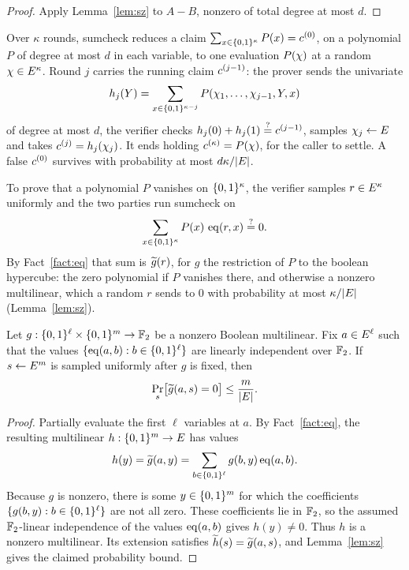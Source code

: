 \begin{proof}
Apply Lemma~\ref{lem:sz} to $A-B$, nonzero of total degree at most $d$.
\end{proof}


\begin{fact}\label{fact:sumcheck}
Over $\kappa$ rounds, sumcheck reduces a claim $\sum_{x\in\{0,1\}^{\kappa}}P(x)=c^{(0)}$, on a polynomial $P$ of degree at most $d$ in each variable, to one evaluation $P(\chi)$ at a random $\chi\in E^{\kappa}$. Round $j$ carries the running claim $c^{(j-1)}$: the prover sends the univariate
\[
  h_j(Y)=\sum_{x\in\{0,1\}^{\kappa-j}}P(\chi_1,\dots,\chi_{j-1},Y,x)
\]
of degree at most $d$, the verifier checks $h_j(0)+h_j(1)\stackrel{?}{=}c^{(j-1)}$, samples $\chi_j\leftarrow E$ and takes $c^{(j)}=h_j(\chi_j)$. It ends holding $c^{(\kappa)}=P(\chi)$, for the caller to settle. A false $c^{(0)}$ survives with probability at most $d\kappa/|E|$.
\end{fact}

\begin{definition}[Zerocheck]\label{def:zerocheck}
To prove that a polynomial $P$ vanishes on $\{0,1\}^{\kappa}$, the verifier samples $r\in E^{\kappa}$ uniformly and the two parties run sumcheck on
\[
  \sum_{x\in\{0,1\}^{\kappa}}P(x)\,\operatorname{eq}(r,x)\stackrel{?}{=} 0 .
\]
By Fact~\ref{fact:eq} that sum is $\widetilde{g}(r)$, for $g$ the restriction of $P$ to the boolean hypercube: the zero polynomial if $P$ vanishes there, and otherwise a nonzero multilinear, which a random $r$ sends to $0$ with probability at most $\kappa/|E|$ (Lemma~\ref{lem:sz}).
\end{definition}

\begin{lemma}\label{lem:fixed-zerocheck}
Let $g:\{0,1\}^{\ell}\times\{0,1\}^{m}\to\mathbb{F}_2$ be a nonzero Boolean multilinear. Fix $a\in E^{\ell}$ such that the values $\{\operatorname{eq}(a,b):b\in\{0,1\}^{\ell}\}$ are linearly independent over $\mathbb{F}_2$. If $s\leftarrow E^m$ is sampled uniformly after $g$ is fixed, then
\[
  \Pr_s\bigl[\widetilde{g}(a,s)=0\bigr]\leq\frac{m}{|E|}.
\]
\end{lemma}

\begin{proof}
Partially evaluate the first $\ell$ variables at $a$. By Fact~\ref{fact:eq}, the resulting multilinear $h:\{0,1\}^{m}\to E$ has values
\[
  h(y)=\widetilde{g}(a,y)=\sum_{b\in\{0,1\}^{\ell}}g(b,y)\operatorname{eq}(a,b).
\]
Because $g$ is nonzero, there is some $y\in\{0,1\}^{m}$ for which the coefficients $\{g(b,y):b\in\{0,1\}^{\ell}\}$ are not all zero. These coefficients lie in $\mathbb{F}_2$, so the assumed $\mathbb{F}_2$-linear independence of the values $\operatorname{eq}(a,b)$ gives $h(y)\neq0$. Thus $h$ is a nonzero multilinear. Its extension satisfies $\widetilde{h}(s)=\widetilde{g}(a,s)$, and Lemma~\ref{lem:sz} gives the claimed probability bound.
\end{proof}

